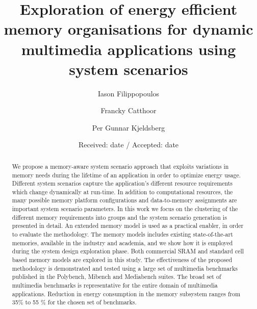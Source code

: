 \documentclass[smallextended]{svjour3}
\begin{document}
\title{Exploration of energy efficient memory organisations for dynamic multimedia applications using system scenarios}


\author{Iason Filippopoulos \and Francky Catthoor \and Per Gunnar Kjeldsberg}



\date{Received: date / Accepted: date}


\maketitle

\begin{abstract}
We propose a memory-aware system scenario approach that exploits variations in memory needs during the lifetime of an application in order to optimize energy usage. 
Different system scenarios capture the application's different resource requirements which change dynamically at run-time. 
In addition to computational resources, the many possible memory platform configurations and data-to-memory assignments are important system scenario parameters. 
In this work we focus on the clustering of the different memory requirements into groups and the system scenario generation is presented in detail.
An extended memory model is used as a practical enabler, in order to evaluate the methodology. 
The memory models includes existing state-of-the-art memories, available in the industry and academia, and we show how it is employed during the system design exploration phase. 
Both commercial SRAM and standard cell based memory models are explored in this study. 
The effectiveness of the proposed methodology is demonstrated and tested using a large set of multimedia benchmarks published in the Polybench, Mibench and Mediabench suites.
The broad set of multimedia benchmarks is representative for the entire domain of multimedia applications.
Reduction in energy consumption in the memory subsystem ranges from 35\% to 55 \% for the chosen set of benchmarks.
\end{abstract}
\end{document}
